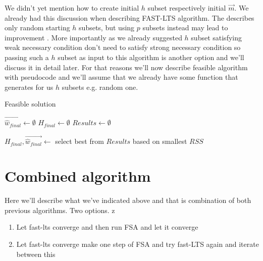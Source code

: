 We didn't yet mention how to create initial $h$ subset respectively initial $\vec{m}$. We already had this discussion when describing FAST-LTS algorithm. The \cite{hawkins:1994} describes only random starting $h$ subsets, but using $p$ subsets instead may lead to improvement . More importantly as we already suggested $h$ subset satisfying weak necessary condition don't need to satisfy strong necessary condition so passing such a $h$ subset as input to this algorithm is another option and we'll discuss it in detail later. For that reasons we'll now describe feasible algorithm with pseudocode and we'll assume that we already have some function that generates for us $h$ subsets e.g. random one. 

\newcommand\mycommfont[1]{\footnotesize\ttfamily\textcolor{blue}{#1}}

\begin{algorithm}[H]
	\label{alg:feasible_solution}
		
	\caption{Feasible solution}
	$\vec{\hat{w}_{final}} \gets \emptyset$\;
	$H_{final} \gets \emptyset$\;
	$Results \gets \emptyset$\;

	$H_{final}, \vec{\hat{w}_{final}}  \gets $ select best from $Results$ based on smallest $RSS$\;
	\;
\end{algorithm}


\section{Combined algorithm}
Here we'll describe what we've indicated above and that is combination of both previous algorithms.
Two options. 
z
\begin{enumerate}
	\item Let fast-lts converge and then run FSA and let it converge
	\item Let fast-lts converge make one step of FSA and try fast-LTS again and iterate between this
\end{enumerate}

